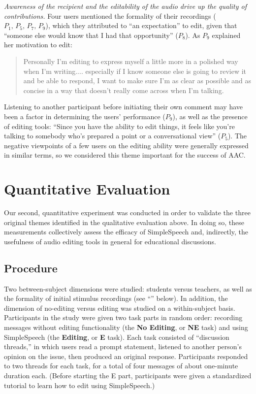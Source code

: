 \emph{Awareness of the recipient and the editability of the audio drive up the quality of contributions.}
Four users mentioned the formality of their recordings ($P_1,\,P_5,\,P_7,\,P_9$), which they attributed to ``an expectation'' to edit, given that ``someone else would know that I had that opportunity'' ($P_8$).
As $P_9$ explained her motivation to edit:
\begin{quote}
	Personally I'm editing to express myself a little more in a polished way when I'm writing.... especially if I know someone else is going to review it and be able to respond, I want to make sure I'm as clear as possible and as concise in a way that doesn't really come across when I'm talking.
\end{quote}
Listening to another participant before initiating their own comment may have been a factor in determining the users' performance ($P_9$), as well as the presence of editing tools: ``Since you have the ability to edit things, it feels like you're talking to somebody who's prepared a point or a conversational view'' ($P_5$). 
The negative viewpoints of a few users on the editing ability were generally expressed in similar terms, so we considered this theme important for the success of AAC.

\vfill

\section{Quantitative Evaluation}
Our second, quantitative experiment was conducted in order to validate the three original themes identified in the qualitative evaluation above.
In doing so, these measurements collectively assess the efficacy of SimpleSpeech and, indirectly, the usefulness of audio editing tools in general for educational discussions.

\subsection{Procedure}
Two between-subject dimensions were studied: students versus teachers, as well as the formality of initial stimulus recordings (see ``'' below).
In addition, the dimension of no-editing versus editing was studied on a within-subject basis.
Participants in the study were given two task parts in random order: recording messages without editing functionality (the \textbf{No Editing}, or \textbf{NE} task) and using SimpleSpeech (the \textbf{Editing}, or \textbf{E} task). 
Each task consisted of ``discussion threads,'' in which users read a prompt statement, listened to another person's opinion on the issue, then produced an original response.
Participants responded to two threads for each task, for a total of four messages of about one-minute duration each.
(Before starting the E part, participants were given a standardized tutorial to learn how to edit using SimpleSpeech.)

